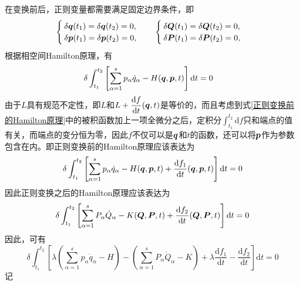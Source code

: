 在变换前后，正则变量都需要满足固定边界条件，即
\begin{align*}
	\begin{cases}
		\delta\boldsymbol{q}(t_1) = \delta \boldsymbol{q}(t_2) = 0, \\
		\delta\boldsymbol{p}(t_1) = \delta \boldsymbol{p}(t_2) = 0,
	\end{cases}\quad 
	\begin{cases}
		\delta\boldsymbol{Q}(t_1) = \delta \boldsymbol{Q}(t_2) = 0, \\
		\delta\boldsymbol{P}(t_1) = \delta \boldsymbol{P}(t_2) = 0,
	\end{cases}
\end{align*}
根据相空间Hamilton原理，有
\begin{align}
	& \delta \int_{t_1}^{t_2} \left[\sum_{\alpha=1}^s p_\alpha \dot{q}_\alpha - H(\mbf{q},\mbf{p},t)\right] \mathrm{d} t = 0 \label{正则变换前的Hamilton原理} %
\end{align}
由于$L$具有规范不定性，即$L$和$L+\dfrac{\mathrm{d} f}{\mathrm{d} t}(\boldsymbol{q},t)$是等价的，而且考虑到式\eqref{正则变换前的Hamilton原理}中的被积函数加上一项全微分之后，定积分$\displaystyle \int_{t_1}^{t_2} \mathrm{d} f$只和端点的值有关，而端点的变分恒为零，因此$f$不仅可以是$\boldsymbol{q}$和$t$的函数，还可以将$\boldsymbol{p}$作为参数包含在内。即正则变换前的Hamilton原理应该表达为
\begin{equation}
	\delta \int_{t_1}^{t_2} \left[\sum_{\alpha=1}^s p_\alpha \dot{q}_\alpha - H(\boldsymbol{q},\boldsymbol{p},t) + \frac{\mathrm{d} f_1}{\mathrm{d} t}(\boldsymbol{q},\boldsymbol{p},t)\right] \mathrm{d} t = 0 \label{正则变换前的Hamilton原理一般形式}
\end{equation}
因此正则变换之后的Hamilton原理应该表达为
\begin{equation}
	\delta \int_{t_1}^{t_2} \left[\sum_{\alpha=1}^s P_\alpha \dot{Q}_\alpha - K(\boldsymbol{Q},\boldsymbol{P},t) + \frac{\mathrm{d} f_2}{\mathrm{d} t}(\boldsymbol{Q},\boldsymbol{P},t)\right] \mathrm{d} t = 0 \label{正则变换前的Hamilton原理一般形式}
\end{equation}
因此，可有
\begin{equation}
	\delta \int_{t_1}^{t_2} \left[\lambda \left(\sum_{\alpha=1}^s p_\alpha \dot{q}_\alpha - H\right) - \left(\sum_{\alpha=1}^s P_\alpha \dot{Q}_\alpha - K\right) + \lambda \frac{\mathrm{d} f_1}{\mathrm{d} t} - \frac{\mathrm{d} f_2}{\mathrm{d} t}\right] \mathrm{d} t = 0
\end{equation}
记
